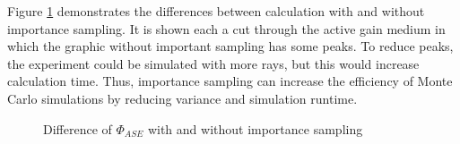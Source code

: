 Figure \ref{graphic:importance} demonstrates
the differences between calculation with and without
importance sampling. It is shown each a cut through the active
gain medium in which the graphic without important
sampling has some peaks. To reduce peaks, the experiment
could be simulated with more rays, but this would increase
calculation time. Thus, importance sampling can increase the
efficiency of Monte Carlo simulations by reducing variance 
and simulation runtime. 
\begin{figure}[H]
  \centerline
  {}
  \caption{Difference of $\Phi_{ASE}$ with and without importance sampling}
  \label{graphic:importance}
\end{figure}

